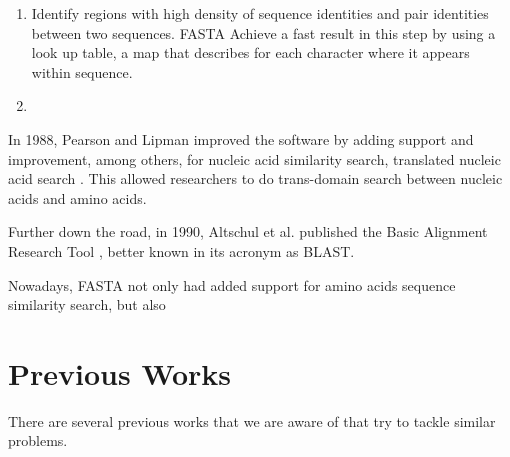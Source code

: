 \begin{enumerate}
\item Identify regions with high density of sequence identities and pair identities between two sequences. FASTA Achieve a fast result in this step by using a look up table, a map that describes for each character where it appears within sequence.

\item 
\end{enumerate}


 In 1988, Pearson and Lipman improved the software by adding support and improvement, among others, for nucleic acid similarity search, translated nucleic acid search \citep{PearsonLipman88}. This allowed researchers to do trans-domain search between nucleic acids and amino acids.

Further down the road, in 1990, Altschul et al. published the Basic Alignment Research Tool \citep{Altschul90}, better known in its acronym as BLAST.

Nowadays, FASTA not only had added support for amino acids sequence similarity search, but also 


\section{Previous Works}

There are several previous works that we are aware of that try to tackle similar problems. 